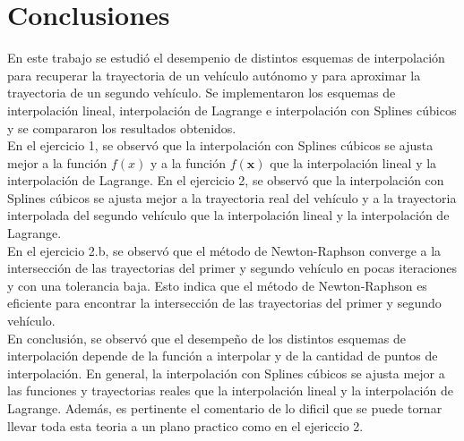 \section{Conclusiones}
En este trabajo se estudió el desempenio de distintos esquemas de interpolación para recuperar la trayectoria de un vehículo autónomo y para aproximar la trayectoria de un segundo vehículo. Se implementaron los esquemas de interpolación lineal, interpolación de Lagrange e interpolación con Splines cúbicos y se compararon los resultados obtenidos.\\
En el ejercicio 1, se observó que la interpolación con Splines cúbicos se ajusta mejor a la función $f(x)$ y a la función $f(\textbf{x})$ que la interpolación lineal y la interpolación de Lagrange. En el ejercicio 2, se observó que la interpolación con Splines cúbicos se ajusta mejor a la trayectoria real del vehículo y a la trayectoria interpolada del segundo vehículo que la interpolación lineal y la interpolación de Lagrange.\\
En el ejercicio 2.b, se observó que el método de Newton-Raphson converge a la intersección de las trayectorias del primer y segundo vehículo en pocas iteraciones y con una tolerancia baja. Esto indica que el método de Newton-Raphson es eficiente para encontrar la intersección de las trayectorias del primer y segundo vehículo.\\
En conclusión, se observó que el desempeño de los distintos esquemas de interpolación depende de la función a interpolar y de la cantidad de puntos de interpolación. En general, la interpolación con Splines cúbicos se ajusta mejor a las funciones y trayectorias reales que la interpolación lineal y la interpolación de Lagrange. Además, es pertinente el comentario de lo dificil que se puede tornar llevar toda esta teoria a un plano practico como en el ejericcio 2.